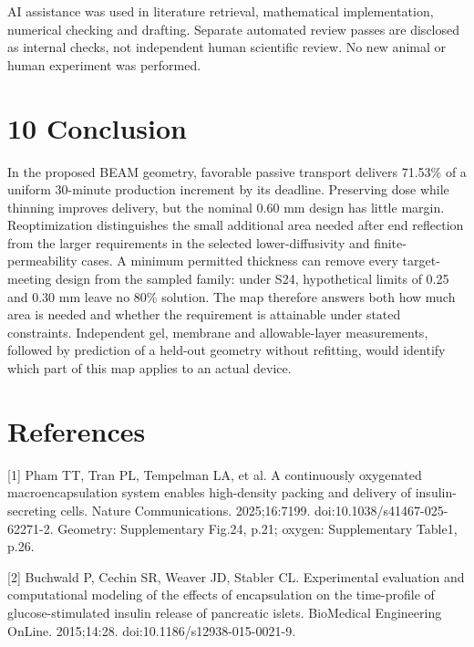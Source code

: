 \documentclass[11pt]{article}
\begin{document}
AI assistance was used in literature retrieval, mathematical implementation, numerical checking and drafting. Separate automated review passes are disclosed as internal checks, not independent human scientific review. No new animal or human experiment was performed.

\par\noindent\begin{minipage}{\linewidth}
\section*{10 Conclusion}
In the proposed BEAM geometry, favorable passive transport delivers 71.53\% of a uniform 30-minute production increment by its deadline. Preserving dose while thinning improves delivery, but the nominal 0.60 mm design has little margin. Reoptimization distinguishes the small additional area needed after end reflection from the larger requirements in the selected lower-diffusivity and finite-permeability cases. A minimum permitted thickness can remove every target-meeting design from the sampled family: under S24, hypothetical limits of 0.25 and 0.30 mm leave no 80\% solution. The map therefore answers both how much area is needed and whether the requirement is attainable under stated constraints. Independent gel, membrane and allowable-layer measurements, followed by prediction of a held-out geometry without refitting, would identify which part of this map applies to an actual device.

\section*{References}
\par\noindent\begin{minipage}{\linewidth}\small [1] Pham TT, Tran PL, Tempelman LA, et al. A continuously oxygenated macroencapsulation system enables high-density packing and delivery of insulin-secreting cells. Nature Communications. 2025;16:7199. doi:10.1038/s41467-025-62271-2. Geometry: Supplementary Fig.24, p.21; oxygen: Supplementary Table1, p.26.\end{minipage}\par\vspace{2pt}

\par\noindent\begin{minipage}{\linewidth}\small [2] Buchwald P, Cechin SR, Weaver JD, Stabler CL. Experimental evaluation and computational modeling of the effects of encapsulation on the time-profile of glucose-stimulated insulin release of pancreatic islets. BioMedical Engineering OnLine. 2015;14:28. doi:10.1186/s12938-015-0021-9.\end{minipage}\par\vspace{2pt}


\end{minipage}
\end{document}
